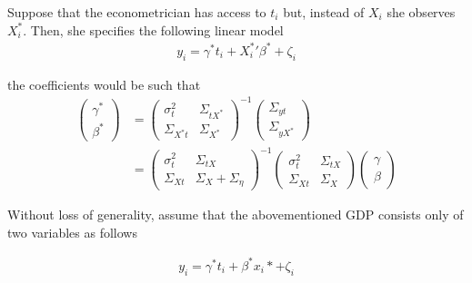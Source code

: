 \documentclass[10pt]{article}
\begin{document}
        Suppose that the econometrician has access to $t_i$ but, instead of $X_i$ she observes $X^*_i$. Then, she specifies the following linear model
        \begin{align}
            y_i = \gamma^* t_i + {X^{*}_i}' \beta^* + \zeta_i
        \end{align}
        
        the coefficients would be such that
        \begin{align}
            \left(\begin{array}{l}
        {\gamma}^* \\
        {\beta}^*
        \end{array}\right)&=\left(\begin{array}{cc}
        {\sigma}^2_{t} & \Sigma_{tX^*} \\
        \Sigma_{X^*t} & {\Sigma}_{X^*}
        \end{array}\right)^{-1}\left(\begin{array}{c}
        \Sigma_{yt} \\
        \Sigma_{yX^*}
        \end{array}\right) \\
        & =\left(\begin{array}{cc}
        {\sigma}^2_{t} & \Sigma_{tX} \\
        \Sigma_{Xt} & {\Sigma}_{X}+{\Sigma}_{\eta}
        \end{array}\right)^{-1}\left(\begin{array}{cc}
        {\sigma}^2_{t} & \Sigma_{tX} \\
        \Sigma_{Xt} & {\Sigma}_{X}
        \end{array}\right)\left(\begin{array}{l}
        {\gamma} \\
        {\beta}
        \end{array}\right)
        \end{align}
        
        Without loss of generality, assume that the abovementioned GDP consists only of two variables as follows
        
             \begin{align}
                    y_i = \gamma^* t_i +  \beta^*x_i* + \zeta_i
                \end{align}
        
\end{document}

